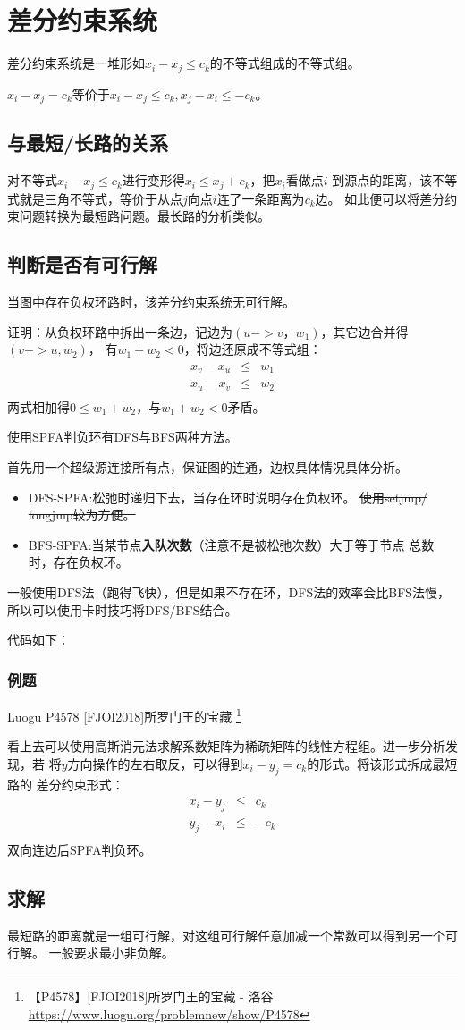 \section{差分约束系统}
差分约束系统是一堆形如$x_i-x_j\leq c_k$的不等式组成的不等式组。

$x_i-x_j=c_k$等价于$x_i-x_j\leq c_k,x_j-x_i\leq -c_k$。

\subsection{与最短/长路的关系}
对不等式$x_i-x_j\leq c_k$进行变形得$x_i\leq x_j+c_k$，把$x_i$看做点$i$
到源点的距离，该不等式就是三角不等式，等价于从点$j$向点$i$连了一条距离为$c_k$边。
如此便可以将差分约束问题转换为最短路问题。最长路的分析类似。

\subsection{判断是否有可行解}

\begin{theorem}
    当图中存在负权环路时，该差分约束系统无可行解。
\end{theorem}

证明：从负权环路中拆出一条边，记边为$(u->v，w_1)$，其它边合并得$(v->u,w_2)$，
有$w_1+w_2<0$，将边还原成不等式组：
\begin{eqnarray*}
    x_v-x_u&\leq& w_1\\
    x_u-x_v&\leq& w_2\\
\end{eqnarray*}
两式相加得$0\leq w_1+w_2$，与$w_1+w_2<0$矛盾。

使用SPFA判负环有DFS与BFS两种方法。

首先用一个超级源连接所有点，保证图的连通，边权具体情况具体分析。

\begin{itemize}
    \item DFS-SPFA:松弛时递归下去，当存在环时说明存在负权环。
    \sout{使用setjmp/\\longjmp较为方便。}
    \item BFS-SPFA:当某节点{\bfseries 入队次数}（注意不是被松弛次数）大于等于节点
    总数时，存在负权环。
\end{itemize}
一般使用DFS法（跑得飞快），但是如果不存在环，DFS法的效率会比BFS法慢，
所以可以使用卡时技巧将DFS/BFS结合。

代码如下：


\subsubsection{例题}
Luogu P4578 [FJOI2018]所罗门王的宝藏
\footnote{【P4578】[FJOI2018]所罗门王的宝藏 - 洛谷
\url{https://www.luogu.org/problemnew/show/P4578}}

看上去可以使用高斯消元法求解系数矩阵为稀疏矩阵的线性方程组。进一步分析发现，若
将$y$方向操作的左右取反，可以得到$x_i-y_j=c_k$的形式。将该形式拆成最短路的
差分约束形式：
\begin{eqnarray*}
    x_i-y_j&\leq& c_k\\
    y_j-x_i&\leq& -c_k\\
\end{eqnarray*}
双向连边后SPFA判负环。

\subsection{求解}
最短路的距离就是一组可行解，对这组可行解任意加减一个常数可以得到另一个可行解。
一般要求最小非负解。
